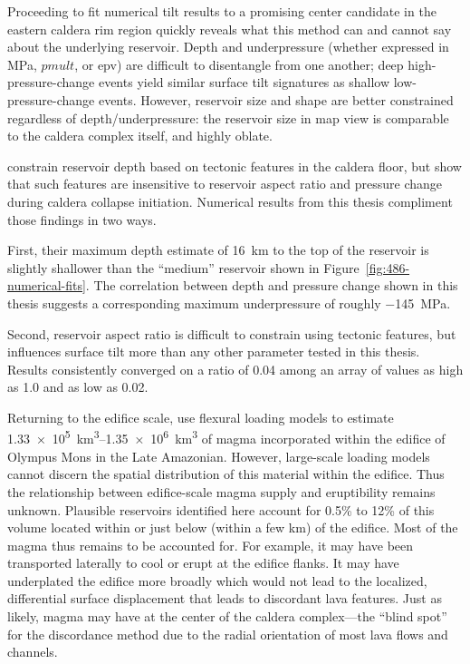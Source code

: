 Proceeding to fit numerical tilt results to a promising center candidate in the eastern caldera rim region quickly reveals what this method can and cannot say about the underlying reservoir. Depth and underpressure (whether expressed in \unit{\mega\Pa}, $pmult$, or \acs{epv}) are difficult to disentangle from one another; deep high-pressure-change events yield similar surface tilt signatures as shallow low-pressure-change events. However, reservoir size and shape are better constrained regardless of depth/underpressure: the reservoir size in map view is comparable to the caldera complex itself, and highly oblate.

\textcite{zuber_caldera_1992} constrain reservoir depth based on tectonic features in the caldera floor, but show that such features are insensitive to reservoir aspect ratio and pressure change during caldera collapse initiation. Numerical results from this thesis compliment those findings in two ways. 

First, their maximum depth estimate of \qty{16}{\km} to the top of the reservoir is slightly shallower than the ``medium'' reservoir shown in Figure~\ref{fig:486-numerical-fits}. The correlation between depth and pressure change shown in this thesis suggests a corresponding maximum underpressure of roughly \qty{-145}{\mega\Pa}.  

Second, reservoir aspect ratio is difficult to constrain using tectonic features, but influences surface tilt more than any other parameter tested in this thesis. Results consistently converged on a ratio of 0.04 among an array of values as high as 1.0 and as low as 0.02. 

Returning to the edifice scale, \textcite{chadwick_late_2015} use flexural loading models to estimate \qtyrange{1.33e5}{1.35e6}{\km\cubed} of magma incorporated within the edifice of Olympus Mons in the Late Amazonian. However, large-scale loading models cannot discern the spatial distribution of this material within the edifice. Thus the relationship between edifice-scale magma supply and eruptibility remains unknown. Plausible reservoirs identified here account for 0.5\% to 12\% of this volume located within or just below (within a few km) of the edifice. Most of the magma thus remains to be accounted for. For example, it may have been transported laterally to cool or erupt at the edifice flanks. It may have underplated the edifice more broadly which would not lead to the localized, differential surface displacement that leads to discordant lava features. Just as likely, magma may have at the center of the caldera complex---the ``blind spot'' for the discordance method due to the radial orientation of most lava flows and channels.

